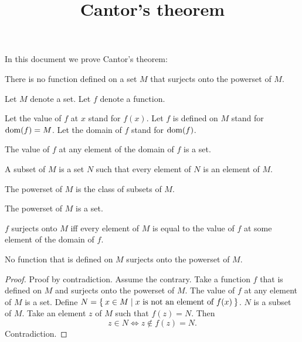 \documentclass{article}
\title{Cantor's theorem}
\author{}
\date{}
\begin{document}

  \maketitle

  In this document we prove Cantor's theorem:

  \begin{quotedtheorem}
    There is no function defined on a set $M$ that surjects onto the powerset of $M$.
  \end{quotedtheorem}

  \begin{forthel}

    Let $M$ denote a set. Let $f$ denote a function.

    Let the value of $f$ at $x$ stand for $f(x)$.
    Let $f$ is defined on $M$ stand for $\operatorname{dom}(f) = M$.
    Let the domain of $f$ stand for $\operatorname{dom}(f)$.


    \begin{axiom}
      The value of $f$ at any element of the domain of $f$ is a set.
    \end{axiom}

    \begin{definition}[Subset]
      A subset of $M$ is a set $N$ such that every element of $N$ is an element of $M$.
    \end{definition}

    \begin{definition}
      The powerset of $M$ is the class of subsets of $M$.
    \end{definition}

    \begin{axiom}
      The powerset of $M$ is a set.
    \end{axiom}

    \begin{definition}
      $f$ surjects onto $M$ iff every element of $M$ is equal to the value of $f$ at some element of the domain of $f$.
    \end{definition}

    \begin{theorem}[Cantor]
      No function that is defined on $M$ surjects onto the powerset of $M$.
    \end{theorem}
    \begin{proof}
      Proof by contradiction.
      Assume the contrary.
      Take a function $f$ that is defined on $M$ and surjects onto the powerset of $M$.
      The value of $f$ at any element of $M$ is a set.
      Define $N = \Set{x \in M | \text{$x$ is not an element of $f(x)$}}$.
      $N$ is a subset of $M$.
      Take an element $z$ of $M$ such that $f(z) = N$.
      Then \[ z\in N \iff z\notin f(z) = N. \]
      Contradiction.
    \end{proof}
  \end{forthel}
\end{document}
